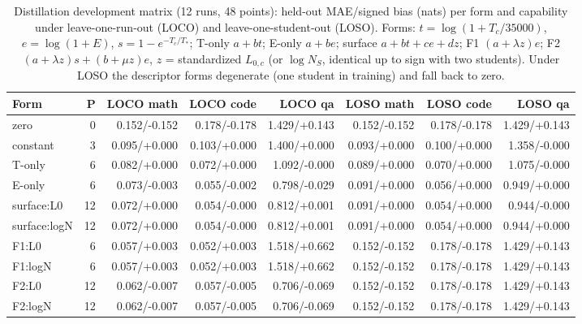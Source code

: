 \begin{table}[t]\centering\scriptsize\setlength{\tabcolsep}{2pt}
\begin{tabular}{@{}lrrrrrrr@{}}
\toprule
Form & P & LOCO math & LOCO code & LOCO qa & LOSO math & LOSO code & LOSO qa \\
\midrule
zero & 0 & 0.152/-0.152 & 0.178/-0.178 & 1.429/+0.143 & 0.152/-0.152 & 0.178/-0.178 & 1.429/+0.143 \\
constant & 3 & 0.095/+0.000 & 0.103/+0.000 & 1.400/+0.000 & 0.093/+0.000 & 0.100/+0.000 & 1.358/-0.000 \\
T-only & 6 & 0.082/+0.000 & 0.072/+0.000 & 1.092/-0.000 & 0.089/+0.000 & 0.070/+0.000 & 1.075/-0.000 \\
E-only & 6 & 0.073/-0.003 & 0.055/-0.002 & 0.798/-0.029 & 0.091/+0.000 & 0.056/+0.000 & 0.949/+0.000 \\
surface:L0 & 12 & 0.072/+0.000 & 0.054/-0.000 & 0.812/+0.001 & 0.091/+0.000 & 0.054/+0.000 & 0.944/-0.000 \\
surface:logN & 12 & 0.072/+0.000 & 0.054/-0.000 & 0.812/+0.001 & 0.091/+0.000 & 0.054/+0.000 & 0.944/+0.000 \\
F1:L0 & 6 & 0.057/+0.003 & 0.052/+0.003 & 1.518/+0.662 & 0.152/-0.152 & 0.178/-0.178 & 1.429/+0.143 \\
F1:logN & 6 & 0.057/+0.003 & 0.052/+0.003 & 1.518/+0.662 & 0.152/-0.152 & 0.178/-0.178 & 1.429/+0.143 \\
F2:L0 & 12 & 0.062/-0.007 & 0.057/-0.005 & 0.706/-0.069 & 0.152/-0.152 & 0.178/-0.178 & 1.429/+0.143 \\
F2:logN & 12 & 0.062/-0.007 & 0.057/-0.005 & 0.706/-0.069 & 0.152/-0.152 & 0.178/-0.178 & 1.429/+0.143 \\
\bottomrule\end{tabular}
\caption{Distillation development matrix (12 runs, 48 points): held-out MAE/signed bias (nats) per form and capability under leave-one-run-out (LOCO) and leave-one-student-out (LOSO). Forms: $t=\log(1+T_c/35000)$, $e=\log(1+E)$, $s=1-e^{-T_c/T_*}$; T-only $a+bt$; E-only $a+be$; surface $a+bt+ce+dz$; F1 $(a+\lambda z)e$; F2 $(a+\lambda z)s+(b+\mu z)e$, $z$ = standardized $L_{0,c}$ (or $\log N_S$, identical up to sign with two students). Under LOSO the descriptor forms degenerate (one student in training) and fall back to zero.}
\label{tab:v56_forms}\end{table}
